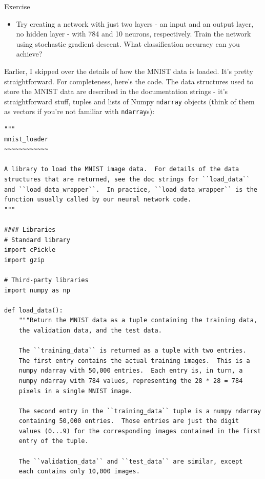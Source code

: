 \begin{exerciseBox}{Exercise}


\begin{itemize}

\item Try creating a network with just two layers - an input and an output layer, no hidden layer - with 784 and 10 neurons, respectively. Train the network using stochastic gradient descent. What classification accuracy can you achieve?

\end{itemize}


Earlier, I skipped over the details of how the MNIST data is loaded. It's pretty straightforward. For completeness, here's the code. The data structures used to store the MNIST data are described in the documentation strings - it's straightforward stuff, tuples and lists of Numpy \texttt{ndarray} objects (think of them as vectors if you're not familiar with \texttt{ndarray}s):



\begin{lstlisting}
"""
mnist_loader
~~~~~~~~~~~~

A library to load the MNIST image data.  For details of the data
structures that are returned, see the doc strings for ``load_data``
and ``load_data_wrapper``.  In practice, ``load_data_wrapper`` is the
function usually called by our neural network code.
"""

#### Libraries
# Standard library
import cPickle
import gzip

# Third-party libraries
import numpy as np

def load_data():
    """Return the MNIST data as a tuple containing the training data,
    the validation data, and the test data.

    The ``training_data`` is returned as a tuple with two entries.
    The first entry contains the actual training images.  This is a
    numpy ndarray with 50,000 entries.  Each entry is, in turn, a
    numpy ndarray with 784 values, representing the 28 * 28 = 784
    pixels in a single MNIST image.

    The second entry in the ``training_data`` tuple is a numpy ndarray
    containing 50,000 entries.  Those entries are just the digit
    values (0...9) for the corresponding images contained in the first
    entry of the tuple.

    The ``validation_data`` and ``test_data`` are similar, except
    each contains only 10,000 images.


\end{lstlisting}
\end{exerciseBox}
